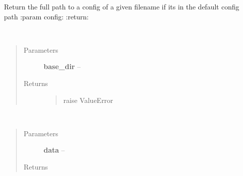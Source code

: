 \documentclass[letterpaper,10pt,english]{sphinxmanual}
\begin{document}

\begin{fulllineitems}
\label{index:aietes.Tools.get_config_file}
Return the full path to a config of a given filename if its in the default config path
:param config:
:return:

\end{fulllineitems}


\begin{fulllineitems}
\label{index:aietes.Tools.get_latest_aietes_datafile}~\begin{quote}\begin{description}
\item[{Parameters}] \leavevmode
\textbf{base\_dir} -- 

\item[{Returns}] \leavevmode
\begin{quote}\begin{description}
\item[{raise ValueError}] \leavevmode
\end{description}\end{quote}


\end{description}\end{quote}

\end{fulllineitems}


\begin{fulllineitems}
\label{index:aietes.Tools.grouper}~\begin{quote}\begin{description}
\item[{Parameters}] \leavevmode
\textbf{data} -- 

\item[{Returns}] \leavevmode


\end{description}\end{quote}

\end{fulllineitems}
\end{document}
